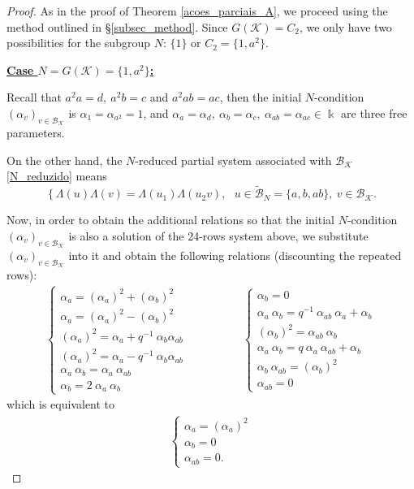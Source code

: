 \documentclass[reqno]{amsart}
\theoremstyle{definition}
\numberwithin{equation}{section}\theoremstyle{plain}
\newcommand{\B}{\mathcal{B}}
\theoremstyle{definition}
\def \k {\Bbbk}
\def \K {\mathcal{K}}
\begin{document}
\begin{proof}
As in the proof of Theorem \ref{acoes_parciais_A}, we proceed using the method outlined in \S \ref{subsec_method}.
Since $G(\K) = C_2$, we only have two possibilities for the subgroup $N$: $\{1\}$ or $C_2= \{1, a^2\}$.

\medbreak

\textbf{\underline{Case $N=G(\K)=\{1, a^2\}$:}}

\smallbreak

Recall that $a^2a = d,\ a^2b=c$ and $a^2ab=ac$, then the initial $N$-condition $(\alpha_v)_{v \in \B_\K}$ is $\alpha_1 = \alpha_{a^2} = 1$, and $\alpha_a = \alpha_{d},\ \alpha_{b} =  \alpha_{c},\ \alpha_{ab} = \alpha_{ac} \in \k$ are three free parameters.

On the other hand, the $N$-reduced partial system associated with $\B_\K$ \eqref{N_reduzido} means 
\begin{equation*}
\left\{
\Lambda(u)\Lambda(v)
 = \Lambda(u_1)\Lambda(u_2 v), 
\right. \ \ \ u \in \tilde{\B}_N = \{a, b, ab\}, \ v \in \B_\K.
\end{equation*}

Now, in order to obtain the additional relations so that the initial $N$-condition $(\alpha_v)_{v \in \B_\K}$ is also a solution of the 24-rows system above, we substitute $(\alpha_v)_{v \in \B_\K}$ into it and obtain the following relations (discounting the repeated rows):
\begin{align*}
\left\{
\begin{array}{lll}
\alpha_a  = (\alpha_{a})^2 + (\alpha_{b})^2 \\
\alpha_a  = (\alpha_{a})^2 - (\alpha_{b})^2 \\
(\alpha_{a})^2 = \alpha_a + q^{-1} \ \alpha_{b} \alpha_{ab} \\
(\alpha_{a})^2 = \alpha_a - q^{-1} \ \alpha_{b} \alpha_{ab} \\
\alpha_a \ \alpha_{b} = \alpha_a \ \alpha_{ab} \\
\alpha_b = 2 \ \alpha_a \ \alpha_b
\end{array} 
\right.
& \qquad \qquad \left\{
\begin{array}{lll}
\alpha_b = 0 \\
\alpha_a \ \alpha_b = q^{-1} \ \alpha_{ab} \ \alpha_a + \alpha_b \\
(\alpha_b)^2 = \alpha_{ab} \ \alpha_b \\
\alpha_a \ \alpha_b = q \ \alpha_a  \ \alpha_{ab} + \alpha_b \\
\alpha_b \ \alpha_{ab} = (\alpha_b)^2 \\
\alpha_{ab} = 0
\end{array} 
\right. 
\end{align*}
which is equivalent to
\begin{align*}
\left\{
\begin{array}{lll}
\alpha_a  = (\alpha_{a})^2 \\
\alpha_b = 0 \\
\alpha_{ab} = 0 .
\end{array} 
\right.
\end{align*}


\end{proof}
\end{document}
